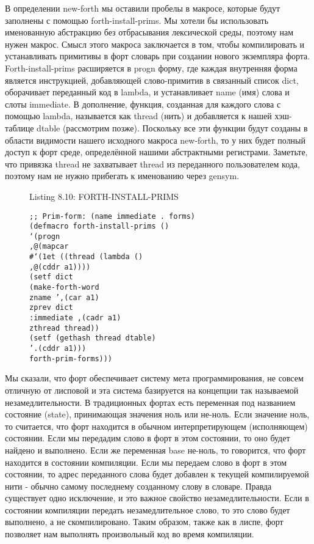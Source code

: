 В определении new-forth мы оставили пробелы в макросе, которые будут заполнены с помощью forth-install-prims. Мы хотели бы использовать именованную абстракцию без отбрасывания лексической среды, поэтому нам нужен макрос. Смысл этого макроса заключается в том, чтобы компилировать и устанавливать примитивы в форт словарь при создании нового экземпляра форта. Forth-install-prims расширяется в progn форму, где каждая внутренняя форма является инструкцией, добавляющей слово-примитив в связанный список dict, оборачивает переданный код в lambda, и устанавливает name (имя) слова и слоты immediate. В дополнение, функция, созданная для каждого слова с помощью lambda, называется как thread (нить) и добавляется к нашей хэш-таблице dtable (рассмотрим позже). Поскольку все эти функции будут созданы в области видимости нашего исходного макроса new-forth, то у них будет полный доступ к форт среде, определённой нашими абстрактными регистрами. Заметьте, что привязка thread не захватывает thread из переданного пользователем кода, поэтому нам не нужно прибегать к именованию через gensym.


\begin{figure}Listing 8.10: FORTH-INSTALL-PRIMS\label{listing_8.10}
\listbegin
\begin{verbatim}
;; Prim-form: (name immediate . forms)
(defmacro forth-install-prims ()
‘(progn
,@(mapcar
#‘(1et ((thread (lambda ()
,@(cddr a1))))
(setf dict
(make-forth-word
zname ’,(car a1)
zprev dict
:immediate ,(cadr a1)
zthread thread))
(setf (gethash thread dtable)
’.(cddr a1)))
forth-prim-forms)))
\end{verbatim}
\listend
\end{figure}

Мы сказали, что форт обеспечивает систему мета программирования, не совсем отличную от лисповой и эта система базируется на концепции так называемой незамедлительности. В традиционных фортах есть переменная под названием состояние (state), принимающая значения ноль или не-ноль. Если значение ноль, то считается, что форт находится в обычном интерпретирующем (исполняющем) состоянии. Если мы передадим слово в форт в этом состоянии, то оно будет найдено и выполнено. Если же переменная base не-ноль, то говорится, что форт находится в состоянии компиляции. Если мы передаем слово в форт в этом состоянии, то адрес переданного слова будет добавлен к текущей компилируемой нити - обычно самому последнему созданному слову в словаре. Правда существует одно исключение, и это важное свойство незамедлительности. Если в состоянии компиляции передать незамедлительное слово, то это слово будет выполнено, а не скомпилировано. Таким образом, также как в лиспе, форт позволяет нам выполнять произвольный код во время компиляции.

